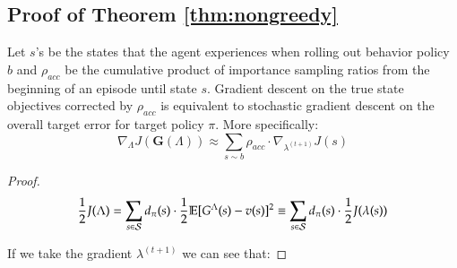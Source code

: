 \subsection{Proof of Theorem \ref{thm:nongreedy}}
\begin{theorem}
Let $s$'s be the states that the agent experiences when rolling out behavior policy $b$ and $\rho_{acc}$ be the cumulative product of importance sampling ratios from the beginning of an episode until state $s$. Gradient descent on the true state objectives corrected by $\rho_{acc}$ is equivalent to stochastic gradient descent on the overall target error for target policy $\pi$. More specifically:
\small
$$\nabla_{\Lambda} J(\bm{G}(\Lambda)) \approx \sum_{s \sim b}{\rho_{acc} \cdot \nabla_{\lambda^{(t+1)}} J(s)}$$
\normalsize
\end{theorem}
\begin{proof}
\begin{equation}
\begin{aligned}
\frac{1}{2} J(\Lambda) = \sum_{s \in \mathcal{S}}{d_\pi(s) \cdot \frac{1}{2} \mathbb{E}[G^\Lambda(s) - v(s)]^2} \equiv \sum_{s \in \mathcal{S}}{d_\pi(s) \cdot \frac{1}{2} J(\lambda(s))}
\end{aligned}\nonumber
\end{equation}

If we take the gradient \wrt{} $\lambda^{(t+1)}$ we can see that:


\end{proof}
